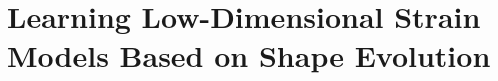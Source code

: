 \chapter{Learning Low-Dimensional Strain Models Based on Shape Evolution}
\label{chp:pcsregression}

\begin{foreword}

\end{foreword}

